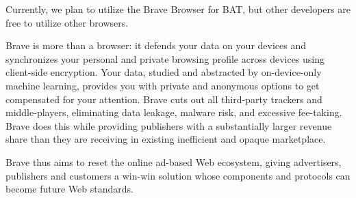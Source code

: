 \documentclass[11pt]{article}
\begin{document}
Currently, we plan to utilize the Brave Browser for BAT, but other developers are free to utilize other browsers. 

Brave is more than a browser: it defends your data on your devices and synchronizes your personal and private browsing profile across devices using client-side encryption. Your data, studied and abstracted by on-device-only machine learning, provides you with private and anonymous options to get compensated for your attention. Brave cuts out all third-party trackers and middle-players, eliminating data leakage, malware risk, and excessive fee-taking. Brave does this while providing publishers with a substantially larger revenue share than they are receiving in existing inefficient and opaque marketplace. 

Brave thus aims to reset the online ad-based Web ecosystem, giving advertisers, publishers and customers a win-win solution whose components and protocols can become future Web standards.
\end{document}
